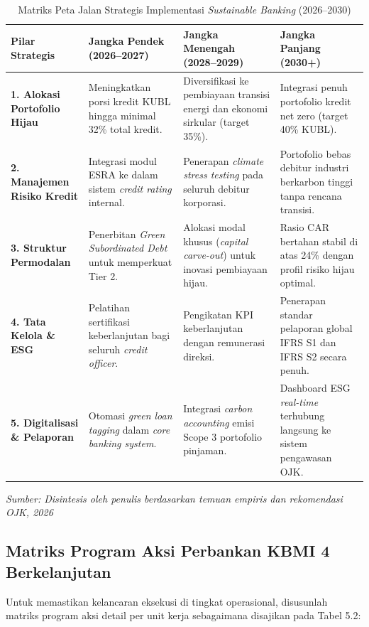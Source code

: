 \documentclass[12pt,a4paper]{article}
\numberwithin{equation}{section}
\begin{document}
\begin{table}[H]
  \caption{Matriks Peta Jalan Strategis Implementasi \emph{Sustainable Banking} (2026--2030)}
  \label{tab:peta_jalan}
  \small
  \begin{tabularx}{\textwidth}{|>{\raggedright\arraybackslash}p{2.5cm}|>{\raggedright\arraybackslash}X|>{\raggedright\arraybackslash}X|>{\raggedright\arraybackslash}X|}
    \hline
    \textbf{Pilar Strategis} & \textbf{Jangka Pendek (2026--2027)} & \textbf{Jangka Menengah (2028--2029)} & \textbf{Jangka Panjang (2030+)} \\
    \hline
    \textbf{1. Alokasi Portofolio Hijau} & Meningkatkan porsi kredit KUBL hingga minimal 32\% total kredit. & Diversifikasi ke pembiayaan transisi energi dan ekonomi sirkular (target 35\%). & Integrasi penuh portofolio kredit net zero (target 40\% KUBL). \\
    \hline
    \textbf{2. Manajemen Risiko Kredit} & Integrasi modul ESRA ke dalam sistem \emph{credit rating} internal. & Penerapan \emph{climate stress testing} pada seluruh debitur korporasi. & Portofolio bebas debitur industri berkarbon tinggi tanpa rencana transisi. \\
    \hline
    \textbf{3. Struktur Permodalan} & Penerbitan \emph{Green Subordinated Debt} untuk memperkuat Tier 2. & Alokasi modal khusus (\emph{capital carve-out}) untuk inovasi pembiayaan hijau. & Rasio CAR bertahan stabil di atas 24\% dengan profil risiko hijau optimal. \\
    \hline
    \textbf{4. Tata Kelola \& ESG} & Pelatihan sertifikasi keberlanjutan bagi seluruh \emph{credit officer}. & Pengikatan KPI keberlanjutan dengan remunerasi direksi. & Penerapan standar pelaporan global IFRS S1 dan IFRS S2 secara penuh. \\
    \hline
    \textbf{5. Digitalisasi \& Pelaporan} & Otomasi \emph{green loan tagging} dalam \emph{core banking system}. & Integrasi \emph{carbon accounting} emisi Scope 3 portofolio pinjaman. & Dashboard ESG \emph{real-time} terhubung langsung ke sistem pengawasan OJK. \\
    \hline
  \end{tabularx}
  \begin{flushleft}
    \textit{Sumber: Disintesis oleh penulis berdasarkan temuan empiris dan rekomendasi OJK, 2026}
  \end{flushleft}
\end{table}

\subsection{Matriks Program Aksi Perbankan KBMI 4 Berkelanjutan}
\noindent
Untuk memastikan kelancaran eksekusi di tingkat operasional, disusunlah matriks program aksi detail per unit kerja sebagaimana disajikan pada Tabel 5.2:
\end{document}
